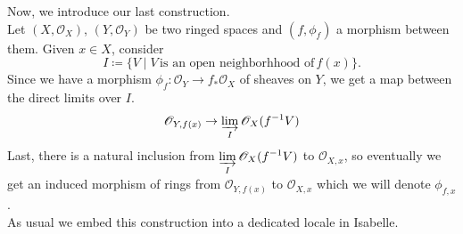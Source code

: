 \documentclass[12pt]{scrartcl}
\begin{document}
Now, we introduce our last construction. \\
	Let $(X, \mathscr{O}_X)$, $(Y, \mathscr{O}_Y)$ be two ringed spaces and $(f, \phi_f)$ a morphism between them. Given $x \in X$, consider 
	\[
	I \coloneqq \lbrace V \mid V \, \text{is an open neighborhhood of}\, f(x) \rbrace .
	\]
	Since we have a morphism $\phi_f: \mathscr{O}_Y \rightarrow f_* \mathscr{O}_X $ of sheaves on $Y$, we get a map between the direct limits over $I$. 
	\[
	\mathscr{O}_{Y, f(x)} \rightarrow \displaystyle \varinjlim_I \mathscr{O}_X (f^{-1} V)
	\]
	Last, there is a natural inclusion from $\displaystyle \varinjlim_I \mathscr{O}_X (f^{-1} V)$ to $\mathscr{O}_{X, x}$, so eventually we get an induced morphism of rings from $\mathscr{O}_{Y, f(x)}$ to $\mathscr{O}_{X, x}$ which we will denote $\phi_{f, x}$. \\	
As usual we embed this construction into a dedicated locale in Isabelle.
\end{document}
